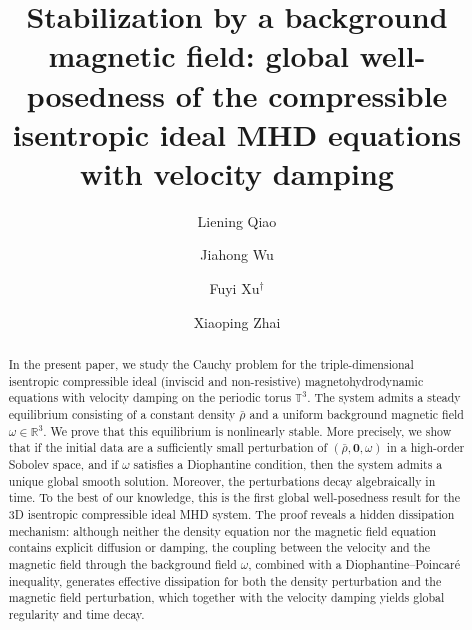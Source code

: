 \documentclass[12pt, reqno]{amsart}
\numberwithin{equation}{section}
\numberwithin{equation}{section}
\numberwithin{equation}{section}
\numberwithin{equation}{section}
\theoremstyle{remark}
\begin{document}
\title[3D Compressible MHD equations]{Stabilization by a background magnetic field: global well-posedness of the compressible isentropic ideal MHD equations with velocity damping}

\author[L. Qiao]{Liening  Qiao }
\address[L. Qiao]{ School of Mathematics and  Statistics, Shandong University of
Technology,  Zibo 255049,  Shandong Province, China}

\author[J. Wu]{Jiahong Wu}
\address[J. Wu]{Department of Mathematics, University of Notre
	Dame, Notre Dame, IN 46556, USA } 
 \author[F. Xu]{Fuyi  Xu$^{\dag}$}
\address[F. Xu]{$^{\dag}$ School of Mathematics and  Statistics, Shandong University of
Technology,  Zibo 255049,  Shandong Province, China} 

\author[X. Zhai]{Xiaoping Zhai}
\address[X. Zhai]{School of Mathematics and Statistics, Guangdong University of Technology,
	Guangzhou, 510520, China.} 

\date{}

\begin{abstract} In the present paper,
we study the Cauchy problem for the triple-dimensional isentropic
compressible ideal (inviscid and non-resistive) magnetohydrodynamic
equations with velocity damping on the periodic torus $\mathbb{T}^3$.
The system admits a steady equilibrium consisting of a constant density
$\bar{\rho}$ and a uniform background magnetic field $\omega\in\mathbb{R}^3$.
We prove that this equilibrium is nonlinearly stable. More precisely,
we show that if the initial data
are a sufficiently small perturbation of $(\bar{\rho},\mathbf{0},\omega)$
 in a high-order Sobolev space, and if
$\omega$ satisfies a Diophantine condition, then the system admits a unique global smooth solution.  Moreover, the
perturbations decay
algebraically in time. To the best of our knowledge, this is the first global well-posedness
result for the 3D isentropic compressible ideal MHD
system.  The proof reveals a hidden dissipation mechanism: although
neither the density equation nor the magnetic field equation contains
explicit diffusion or damping, the coupling between the velocity and
the magnetic field through the background field $\omega$, combined with
a Diophantine--Poincar\'{e} inequality, generates effective dissipation
for both the density perturbation and the magnetic field perturbation,
which together with the velocity damping yields global regularity and
time decay.
\end{abstract}
\end{document}
